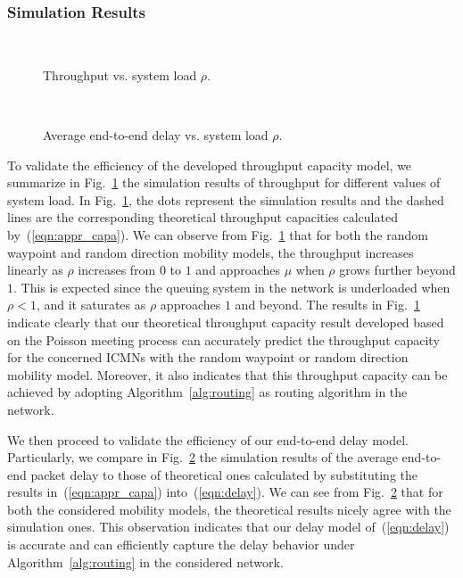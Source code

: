 \documentclass[twocolumn, 10pt]{svjour3}         \smartqed  \usepackage{graphicx}
\begin{document}
\subsubsection{Simulation Results}
\begin{figure}
	\centering
	\\
		\caption{Throughput vs. system load $\rho$.}\label{fig:throughput_vs_load}
\end{figure}
\begin{figure}
	\centering
		\\
		\caption{Average end-to-end delay vs. system load $\rho$.}\label{fig:delay_vs_load}
\end{figure}
To validate the efficiency of the  developed throughput capacity model, we summarize in Fig.~\ref{fig:throughput_vs_load} the simulation results of throughput for different values of system load.
In Fig.~\ref{fig:throughput_vs_load}, the dots represent  the  simulation results and the dashed lines are the corresponding theoretical throughput capacities calculated by~(\ref{eqn:appr_capa}).
We can observe from Fig.~\ref{fig:throughput_vs_load} that for both the random waypoint and random direction mobility models, the throughput  increases linearly as $\rho$ increases from $0$ to $1$ and approaches  $\mu$ when $\rho$ grows further beyond $1$.
This is expected since the queuing system in the network is underloaded when $\rho < 1$,
and it saturates as $\rho$ approaches $1$ and beyond.
The results in Fig.~\ref{fig:throughput_vs_load} indicate clearly that our theoretical throughput capacity result developed based on the Poisson meeting process can accurately predict the throughput capacity for the concerned ICMNs with the random waypoint or random direction mobility model.
Moreover, it also indicates that this throughput capacity can be achieved by adopting Algorithm~\ref{alg:routing} as routing algorithm in the network.







We then proceed to  validate the efficiency of our end-to-end delay model.
Particularly, we compare in Fig.~\ref{fig:delay_vs_load} the simulation results of the average end-to-end packet delay to those of theoretical ones calculated by substituting the results in~(\ref{eqn:appr_capa}) into~(\ref{eqn:delay}).
We can see from Fig.~\ref{fig:delay_vs_load} that for both the considered mobility models, the theoretical results nicely agree with the simulation ones. 
This observation indicates that our delay model of~(\ref{eqn:delay}) is accurate and can efficiently capture the delay behavior under Algorithm~\ref{alg:routing} in the considered network.
\end{document}
